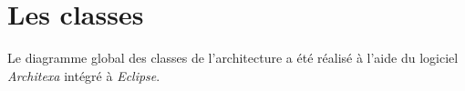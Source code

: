 \section{Les classes}

Le diagramme global des classes de l'architecture a été réalisé à l'aide du logiciel \emph{Architexa} intégré à \emph{Eclipse}.



